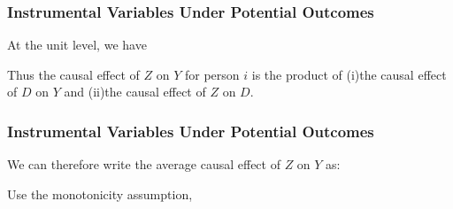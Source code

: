 \documentclass{beamer}
\begin{document}
\begin{frame}
    \frametitle{Instrumental Variables Under Potential Outcomes}
    \begin{flushleft}
        At the unit level, we have
    \end{flushleft}
    \begin{flushleft}
        Thus the causal effect of $Z$ on $Y$ for person $i$ is the product
        of (i)the causal effect of $D$ on $Y$ and (ii)the causal effect
        of $Z$ on $D$.
    \end{flushleft}
\end{frame}

\begin{frame}
    \frametitle{Instrumental Variables Under Potential Outcomes}
    \begin{flushleft}
        We can therefore write the average causal effect of $Z$ on $Y$ as:
    \end{flushleft}
    \begin{flushleft}
        Use the monotonicity assumption,
    \end{flushleft}
\end{frame}
\end{document}
